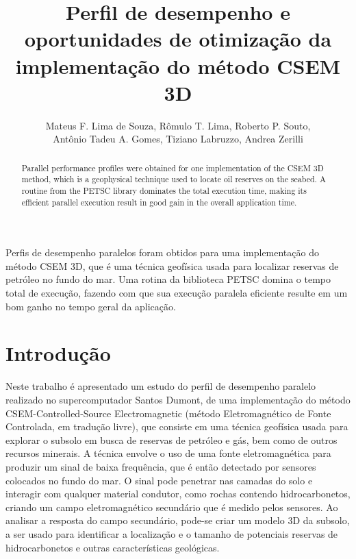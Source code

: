 \documentclass[12pt]{article}
\title{Perfil de desempenho e oportunidades de otimização da implementação do método CSEM 3D}
\author{Mateus F. Lima de Souza\inst{1,2}, Rômulo T. Lima\inst{1,3}, Roberto P. Souto\inst{1}, \\ 
        Antônio Tadeu A. Gomes\inst{1}, Tiziano Labruzzo\inst{1,4}, Andrea Zerilli\inst{1,4}}
\begin{document}
 

\maketitle

\begin{abstract}
Parallel performance profiles were obtained for one implementation of the CSEM 3D method, which is a geophysical technique used to locate oil reserves on the seabed. A routine from the PETSC library dominates the total execution time, making its efficient parallel execution result in good gain in the overall application time.
\end{abstract}
     
\begin{resumo} 
Perfis de desempenho paralelos foram obtidos para uma implementação do método CSEM 3D, que é uma técnica geofísica usada para localizar reservas de petróleo no fundo do mar. Uma rotina da biblioteca PETSC domina o tempo total de execução, fazendo com que sua execução paralela eficiente resulte em um bom ganho no tempo geral da aplicação. 
\end{resumo}


\section{Introdução}
\label{sec:intro}
%
Neste trabalho é apresentado um estudo do perfil de desempenho paralelo realizado no supercomputador Santos Dumont, de uma implementação do método CSEM-Controlled-Source Electromagnetic (método Eletromagnético de Fonte Controlada, em tradução livre)\cite{zerilli2014broadband}, que consiste em uma técnica geofísica usada para explorar o subsolo em busca de reservas de petróleo e gás, bem como de outros recursos minerais. A técnica envolve o uso de uma fonte eletromagnética para produzir um sinal de baixa frequência, que é então detectado por sensores colocados no fundo do mar. O sinal pode penetrar nas camadas do solo e interagir com qualquer material condutor, como rochas contendo hidrocarbonetos, criando um campo eletromagnético secundário que é medido pelos sensores. Ao analisar a resposta do campo secundário, pode-se criar um modelo 3D da subsolo, a ser usado para identificar a localização e o tamanho de potenciais reservas de hidrocarbonetos e outras características geológicas.
\end{document}
